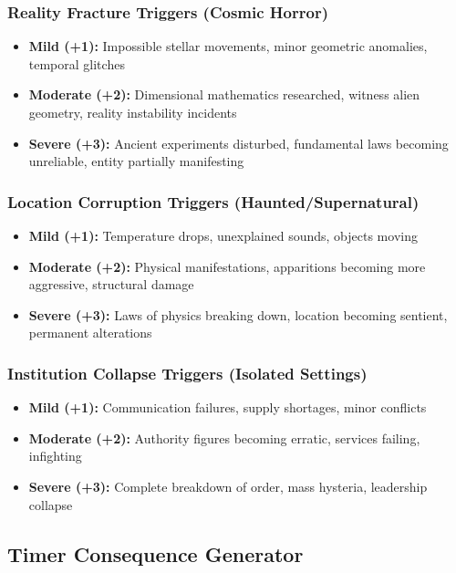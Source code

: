 \documentclass[11pt]{article}
\begin{document}
\subsubsection{Reality Fracture Triggers (Cosmic Horror)}
\begin{itemize}
\item \textbf{Mild (+1):} Impossible stellar movements, minor geometric anomalies, temporal glitches
\item \textbf{Moderate (+2):} Dimensional mathematics researched, witness alien geometry, reality instability incidents
\item \textbf{Severe (+3):} Ancient experiments disturbed, fundamental laws becoming unreliable, entity partially manifesting
\end{itemize}

\subsubsection{Location Corruption Triggers (Haunted/Supernatural)}
\begin{itemize}
\item \textbf{Mild (+1):} Temperature drops, unexplained sounds, objects moving
\item \textbf{Moderate (+2):} Physical manifestations, apparitions becoming more aggressive, structural damage
\item \textbf{Severe (+3):} Laws of physics breaking down, location becoming sentient, permanent alterations
\end{itemize}

\subsubsection{Institution Collapse Triggers (Isolated Settings)}
\begin{itemize}
\item \textbf{Mild (+1):} Communication failures, supply shortages, minor conflicts
\item \textbf{Moderate (+2):} Authority figures becoming erratic, services failing, infighting
\item \textbf{Severe (+3):} Complete breakdown of order, mass hysteria, leadership collapse
\end{itemize}

\subsection{Timer Consequence Generator}
\end{document}
